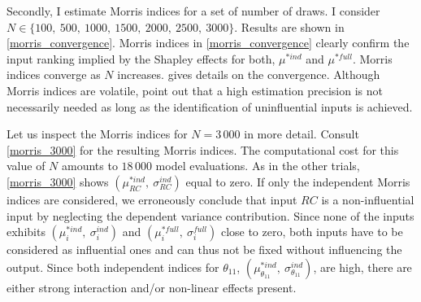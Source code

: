 Secondly, I estimate Morris indices for a set of number of draws. I consider $N \in \{100,\ 500,\ 1000,\ 1500,\ 2000,\ 2500,\ 3000\}$. Results are shown in \cref{morris_convergence}. Morris indices in
\cref{morris_convergence} clearly confirm the input ranking implied by the Shapley effects for both, $\mu^{\ast ind}$ and $\mu^{\ast full}$. Morris indices
converge as $N$ increases.  gives details on the convergence. Although Morris indices are volatile, \citet{GM17} point out that a high estimation precision is not necessarily needed
as long as the identification of uninfluential inputs is achieved.

Let us inspect the Morris indices for $N = 3\,000$ in more detail. Consult \cref{morris_3000} for the
resulting Morris indices. The computational cost for this value of $N$ amounts to $18\,000$
model evaluations. As in the other trials, \cref{morris_3000} shows $(\mu^{\ast ind}_{RC},\ \sigma_{RC}^{ind})$ equal to zero.
If only the independent Morris indices are considered, we erroneously
conclude that input $RC$ is a non-influential input by neglecting the dependent variance contribution. Since none of the inputs exhibits $(\mu^{\ast ind}_i,\ \sigma_i^{ind})$ and $(\mu^{\ast full}_i,\ \sigma_i^{full})$ close to zero, both inputs have to be considered as influential ones and can thus not be fixed without influencing the output.
Since both independent indices for $\theta_{11}$, $(\mu^{\ast ind}_{\theta_{11}},\ \sigma_{\theta_{11}}^{ind})$, are high, there are either strong interaction and/or non-linear effects present.
